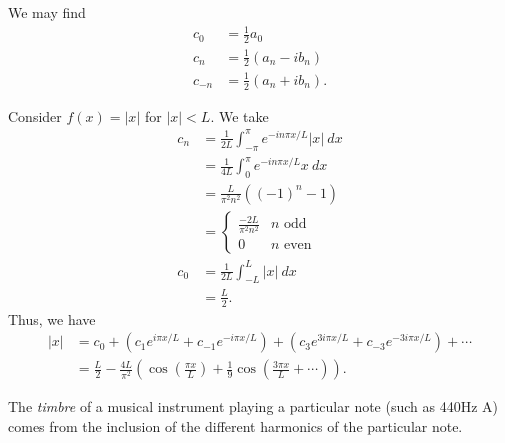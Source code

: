 \documentclass[10pt]{mypackage}
\begin{document}
We may find
\begin{align*}
  c_0 &= \frac{1}{2}a_0\\
  c_n &= \frac{1}{2}\left(a_n - ib_n\right)\\
  c_{-n} &= \frac{1}{2}\left(a_n + ib_n\right).
\end{align*}
\begin{example}
  Consider $f(x) = \left\vert x \right\vert$ for $\left\vert x \right\vert < L$. We take
  \begin{align*}
    c_n &= \frac{1}{2L} \int_{-\pi}^{\pi} e^{-in\pi x/L}\left\vert x \right\vert\:dx\\
        &= \frac{1}{4L}\int_{0}^{\pi} e^{-in\pi x/L}x\:dx\\
        &= \frac{L}{\pi^2n^2}\left( \left(-1\right)^n - 1 \right)\\
        &= \begin{cases}
          \frac{-2L}{\pi^2n^2} & n\text{ odd}\\
          0 & n\text{ even}
        \end{cases}\\
    c_{0} &= \frac{1}{2L}\int_{-L}^{L} \left\vert x \right\vert\:dx\\
          &=\frac{L}{2}.
  \end{align*}
  Thus, we have
  \begin{align*}
    \left\vert x \right\vert &= c_0 + \left(c_1e^{i\pi x/L} + c_{-1}e^{-i \pi x/L}\right) + \left(c_{3}e^{3i\pi x/L} + c_{-3}e^{-3i\pi x/L}\right) + \cdots\\
                             &= \frac{L}{2}-\frac{4L}{\pi^2} \left(\cos\left(\frac{\pi x}{L}\right) + \frac{1}{9}\cos\left(\frac{3\pi x}{L} + \cdots\right)\right).
  \end{align*}
\end{example}
\begin{remark}
  The \textit{timbre} of a musical instrument playing a particular note (such as 440Hz A) comes from the inclusion of the different harmonics of the particular note.
\end{remark}
\end{document}
